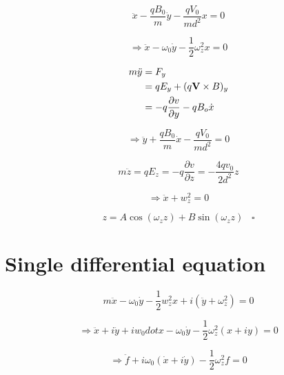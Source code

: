 \documentclass[english,notitlepage,reprint,nofootinbib]{revtex4-1}  %
\begin{document}
\begin{equation*}
    \ddot{x} - \frac{q B_0}{m} \dot{y} - \frac{q V_0}{m d^2} x = 0
\end{equation*}

\begin{equation*}
    \Rightarrow \ddot{x} - \omega_0 \dot{y} - \frac{1}{2} \omega^2_z x = 0
\end{equation*}

\begin{align*}
    m \ddot{y} &= F_y \\
    &= q E_y + (q \vectorbold{V} \times B)_y \\
    &= - q \frac{\partial v}{\partial y} - q B_o \dot{x}
\end{align*}

\begin{equation*}
    \Rightarrow \ddot{y} + \frac{q B_0}{m} \dot{x} - \frac{q V_0}{m d^2} = 0
\end{equation*}

\begin{equation*}
    m \ddot{z} = q E_z = -q \frac{\partial v}{\partial z} = - \frac{4 q v_0}{2 d^2} z
\end{equation*}

\begin{equation*}
    \Rightarrow \ddot{x} + w^2_z = 0
\end{equation*}

\begin{equation*}
    z = A \cos (\omega_z z) + B \sin (\omega_z z)  \;\;\; \square
\end{equation*}


\section{Single differential equation}

\begin{equation*}
    m \ddot{x} - \omega_0 \dot{y} - \frac{1}{2} w_z^2 x + i(\ddot{y} + \omega_z^2) = 0
\end{equation*}

\begin{equation*}
    \Rightarrow \ddot{x} + i \ddot{y} + i w_0 dot{x} - \omega_0 \dot{y} - \frac{1}{2} \omega_z^2 (x + iy) = 0
\end{equation*}

\begin{equation*}
    \Rightarrow \ddot{f} + i \omega_0 (\dot{x} + i \dot{y}) - \frac{1}{2} \omega_z^2 f = 0
\end{equation*}
\end{document}
